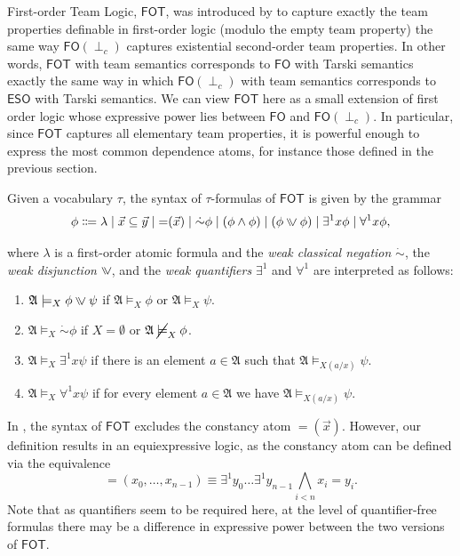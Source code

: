 \documentclass[a4paper]{amsart}
\theoremstyle{definition}
\theoremstyle{remark}
\newcommand{\A}{\mathcal{A}}
\DeclareMathOperator{\dep}{\mathop{=}}
\newcommand{\vx}{\vec{x}}
\newcommand{\vy}{\vec{y}}
\newcommand\ivee{\mathrel{\rotatebox[origin=c]{270}{$\geqslant$}}}
\newcommand{\existsone}{\exists^1}
\newcommand{\forallone}{\forall^1}
\newcommand{\cneg}{\mathord{\dot{\sim}}}
\newcommand\fol{\mathsf{FO}}
\newcommand\fot{\mathsf{FOT}}
\newcommand\eso{\mathsf{ESO}}
\newcommand\foil{\mathsf{FO}(\perp_c)}
\newcommand\nmodels{\mathbin{\cancel{\models}}}
\theoremstyle{definition}
\renewcommand{\A}{\mathfrak{A}}
\begin{document}
First-order Team Logic, $\fot$, was introduced by \textcite{MR4594292} to capture exactly the team properties definable in first-order logic (modulo the empty team property) the same way $\foil$ captures existential second-order team properties. In other words, $\fot$ with team semantics corresponds to $\fol$ with Tarski semantics exactly the same way in which $\foil$ with team semantics corresponds to $\eso$ with Tarski semantics. We can view $\fot$ here as a small extension of first order logic whose expressive power lies between $\fol$ and $\foil$. In particular, since $\fot$ captures all elementary team properties, it is powerful enough to express the most common dependence atoms, for instance those defined in the previous section.



Given a vocabulary $\tau$, the syntax of $\tau$-formulas of $\fot$ is given by the grammar
\[
    \phi \Coloneqq \lambda \mid \vx\subseteq\vy \mid \dep(\vx) \mid \cneg\phi \mid (\phi\land\phi) \mid (\phi\ivee\phi) \mid \existsone x\phi \mid \forallone x\phi,
\]

\noindent where $\lambda$ is a first-order atomic formula and the \emph{weak classical negation} $\cneg$, the \emph{weak disjunction} $\ivee$, and the \emph{weak quantifiers} $\existsone$ and $\forallone$ are interpreted as follows:

\begin{enumerate}[resume]
    \item $\A\models_X \phi \ivee \psi$ if $\A\models_X \phi$ or $\A\models_X \psi$.
    \item $\A\models_X \cneg \phi$ if $X=\emptyset$ or $\A\nmodels_X \phi$.
    \item $\A\models_X \existsone x \psi$ if there is an element $a\in\A$ such that $\A\models_{X(a/x)} \psi$.
    \item $\A\models_X \forallone x \psi$ if for every element $a\in\A$ we have $\A\models_{X(a/x)} \psi$.
\end{enumerate}

In \cite{MR4594292}, the syntax of $\fot$ excludes the constancy atom $\dep(\vx)$. However, our definition results in an equiexpressive logic, as the constancy atom can be defined via the equivalence
\[
    \dep(x_0,\dots,x_{n-1}) \equiv \existsone y_0\dots\existsone y_{n-1}\bigwedge_{i<n}x_i = y_i.
\]
Note that as quantifiers seem to be required here, at the level of quantifier-free formulas there may be a difference in expressive power between the two versions of $\fot$.
\end{document}
